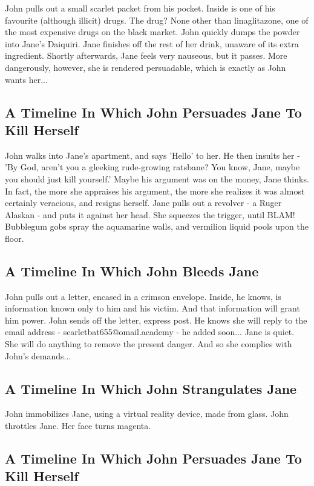 \documentclass{article}
\begin{document}
John pulls out a small scarlet packet from his pocket. Inside is one of his favourite (although illicit) drugs.
The drug? None other than linaglitazone, one of the most expensive drugs on the black market.
John quickly dumps the powder into Jane's Daiquiri.
Jane finishes off the rest of her drink, unaware of its extra ingredient.
Shortly afterwards, Jane feels very nauseous, but it passes.
More dangerously, however, she is rendered persuadable, which is exactly as John wants her...
\subsection{A Timeline In Which John Persuades Jane To Kill Herself}


John walks into Jane's apartment, and says 'Hello' to her.
He then insults her {-} 'By God, aren't you a gleeking rude{-}growing ratsbane?
You know, Jane, maybe you should just kill yourself.'
Maybe his argument was on the money, Jane thinks.
In fact, the more she appraises his argument, the more she realizes it was almost certainly veracious, and resigns herself.
Jane pulls out a revolver {-} a Ruger Alaskan {-} and puts it against her head.
She squeezes the trigger, until BLAM!
Bubblegum gobs spray the aquamarine walls, and vermilion liquid pools upon the floor.
\subsection{A Timeline In Which John Bleeds Jane}


John pulls out a letter, encased in a crimson envelope. Inside, he knows, is information known only to him and his victim. And that information will grant him power.
John sends off the letter, express post. He knows she will reply to the email address {-} scarletbat655@omail.academy {-} he added soon...
Jane is quiet. She will do anything to remove the present danger. And so she complies with John's demands...
\subsection{A Timeline In Which John Strangulates Jane}


John immobilizes Jane, using a virtual reality device, made from glass.
John throttles Jane.
Her face turns magenta.
\subsection{A Timeline In Which John Persuades Jane To Kill Herself}
\end{document}
